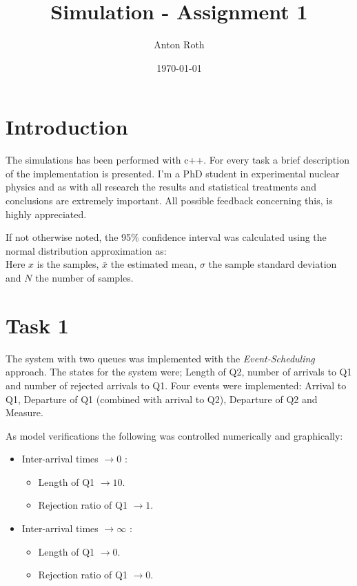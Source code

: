 \documentclass[]{article}
\title{Simulation - Assignment 1}
\author{Anton Roth}
\date{\today}
\begin{document}
\begin{titlepage}
  \maketitle
  \thispagestyle{empty}
\end{titlepage}

\section*{Introduction}
The simulations has been performed with c++.
For every task a brief description of the implementation is presented.
I'm a PhD student in experimental nuclear physics and as with all research the results and statistical treatments and conclusions are extremely important. All possible feedback concerning this, is highly appreciated.

If not otherwise noted, the 95\% confidence interval was calculated using the normal distribution approximation as:
\begin{equation*}
  [\bar{x} - 1.96\cdot\frac{\sigma}{\sqrt{N}}, \bar{x} + 1.96\cdot\frac{\sigma}{\sqrt{N}}]
\end{equation*}
Here $x$ is the samples, $\bar{x}$ the estimated mean, $\sigma$ the sample standard deviation and $N$ the number of samples.

\section{Task 1}
The system with two queues was implemented with the {\it Event-Scheduling} approach. The states for the system were; Length of Q2, number of arrivals to Q1 and number of rejected arrivals to Q1. Four events were implemented: Arrival to Q1, Departure of Q1 (combined with arrival to Q2), Departure of Q2 and Measure.

As model verifications the following was controlled numerically and graphically:
\begin{itemize}
  \item Inter-arrival times $\rightarrow 0$ :
    \begin{itemize}
      \item Length of Q1 $\rightarrow 10$.
      \item Rejection ratio of Q1 $\rightarrow 1$.
    \end{itemize}
  \item Inter-arrival times $\rightarrow \infty$ :
    \begin{itemize}
      \item Length of Q1 $\rightarrow 0$.
      \item Rejection ratio of Q1 $\rightarrow 0$.
    \end{itemize}
\end{itemize}
\end{document}

